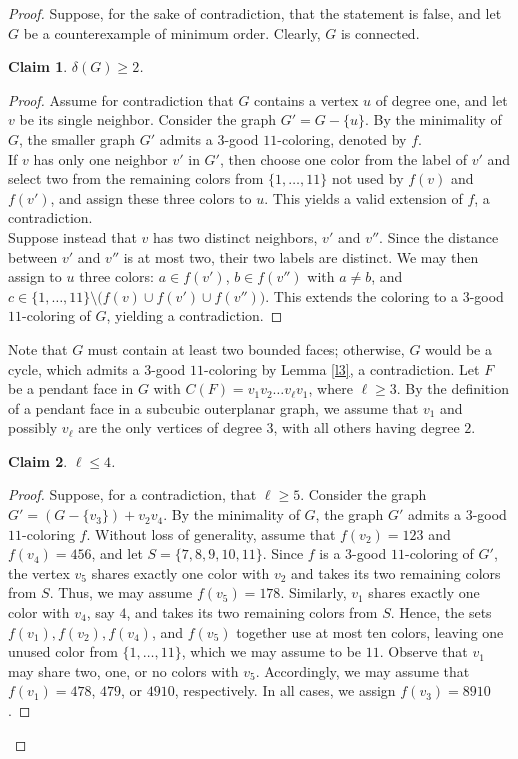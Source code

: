 \documentclass[10pt,a4paper]{amsart}
\newtheorem{claim}{Claim}
\begin{document}
\begin{proof} 
Suppose, for the sake of contradiction, that the statement is false, and let $G$ be a counterexample of minimum order. Clearly, $G$ is connected.
 
\begin{claim}
    $\delta(G) \ge 2$.
\end{claim}

\begin{proof}
Assume for contradiction that $G$ contains a vertex $u$ of degree one, and let $v$ be its single neighbor. Consider the graph $G' = G - \{u\}$. By the minimality of $G$, the smaller graph $G'$ admits a $3$-good $11$-coloring, denoted by $f$.\\
\noindent If $v$ has only one neighbor $v'$ in $G'$, then choose one color from the label of $v'$ and select two from the remaining colors from $\{1,\dots,11\}$ not used by $f(v)$ and $f(v')$, and assign these three colors to $u$. This yields a valid extension of $f$, a contradiction.\\
\noindent Suppose instead that $v$ has two distinct neighbors, $v'$ and $v''$. Since the distance between $v'$ and $v''$ is at most two, their two labels are distinct. We may then assign to $u$ three colors: $a \in f(v')$, $b \in f(v'')$ with $a \ne b$, and $c \in \{1,\dots,11\}\setminus \bigl(f(v)\cup f(v')\cup f(v'')\bigr)$. This extends the coloring to a $3$-good $11$-coloring of $G$, yielding a contradiction.\end{proof}

\noindent Note that $G$ must contain at least two bounded faces; otherwise, $G$ would be a cycle, which admits a $3$-good $11$-coloring by Lemma \ref{l3}, a contradiction. Let $F$ be a pendant face in $G$ with $C(F) = v_1v_2 \dots v_\ell v_1$, where $\ell \ge 3$. By the definition of a pendant face in a subcubic outerplanar graph, we assume that $v_1$ and possibly $v_\ell$ are the only vertices of degree $3$, with all others having degree $2$.

\begin{claim}
   $\ell \leq 4$.
\end{claim}

\begin{proof}
Suppose, for a contradiction, that $\ell \ge 5$. Consider the graph 
$G' = (G - \{v_3\}) + v_2v_4$. By the minimality of $G$, the graph $G'$ admits a $3$-good $11$-coloring $f$. Without loss of generality, assume that $f(v_2) = 123$ and $f(v_4) = 456$, and let $S = \{7,8,9,10,11\}$. Since $f$ is a $3$-good $11$-coloring of $G'$, the vertex $v_5$ shares exactly one color with $v_2$ and takes its two remaining colors from $S$. Thus, we may assume $f(v_5) = 178$. Similarly, $v_1$ shares exactly one color with $v_4$, say $4$, and takes its two remaining colors from $S$. Hence, the sets $f(v_1), f(v_2), f(v_4)$, and $f(v_5)$ together use at most ten colors, leaving one unused color from $\{1,\dots,11\}$, which we may assume to be $11$. Observe that $v_1$ may share two, one, or no colors with $v_5$. Accordingly, we may assume that 
$f(v_1) = 478$, $479$, or $4910$, respectively. In all cases, we assign $f(v_3) = 8910$.


\end{proof}
\end{proof}
\end{document}
